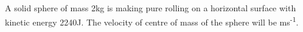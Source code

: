 \item A solid sphere of mass 2kg is making pure rolling on a horizontal surface with kinetic energy 2240J. The velocity of centre of mass of the sphere will be \underline{\hspace{2.5cm}} ms\textsuperscript{-1}.